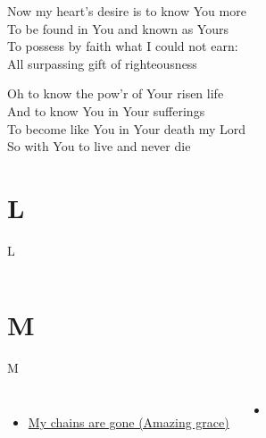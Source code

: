 \documentclass{beamer}
\begin{document}
{\begin{frame}{}
\end{frame}

\hypertarget{Knowing You['All I once held dear']2}{}
\begin{frame}{}
\fontsize{ 18 }{ 23 }\selectfont

Now my heart's desire is to know You more\\ 
To be found in You and known as Yours\\ 
To possess by faith what I could not earn:\\ 
All surpassing gift of righteousness 

\end{frame}

\hypertarget{Knowing You['All I once held dear']3}{}
\begin{frame}{}
\fontsize{ 18 }{ 23 }\selectfont

Oh to know the pow'r of Your risen life\\ 
And to know You in Your sufferings\\ 
To become like You in Your death my Lord\\ 
So with You to live and never die 

\end{frame}

}
\section{L}

\begin{frame}[t]{L}
\begin{columns}[t]

    


    


\end{columns}

\end{frame}

\section{M}

\begin{frame}[t]{M}
\begin{columns}[t]
        \begin{itemize}
    \item \hyperlink{Amazing grace['My chains are gone'](Tomlin)}{My chains are gone (Amazing grace)} \phantom{ 1}
\end{itemize}
        \begin{itemize}
            \item[] \phantom{1}\end{itemize}


\end{columns}

\end{frame}
\end{document}
